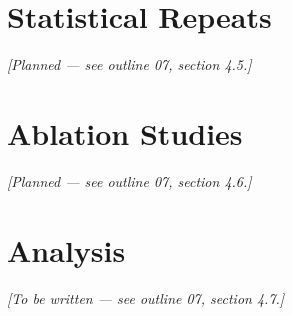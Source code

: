 \section{Statistical Repeats}
\label{sec:exp-stats}
\textit{[Planned — see outline 07, section 4.5.]}

\section{Ablation Studies}
\label{sec:exp-ablation}
\textit{[Planned — see outline 07, section 4.6.]}

\section{Analysis}
\label{sec:exp-analysis}
\textit{[To be written — see outline 07, section 4.7.]}
